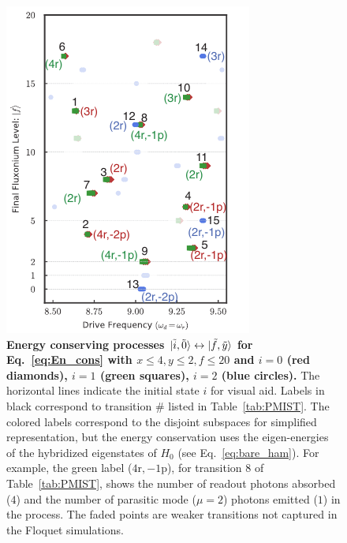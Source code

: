 \documentclass[%
reprint,
superscriptaddress,
 amsmath,amssymb,
 aps,
 prx,
longbibliography,
floatfix,
]{revtex4-2}
\begin{document}
\begin{figure}[t]
    \centering
    \includegraphics[width=\linewidth]{Figures/Trans_.pdf}
    \caption{{\bf Energy conserving processes $\ket{\tilde{i},\tilde{0}}\leftrightarrow\ket{\tilde{f},\tilde{y}}$ for Eq.~\ref{eq:En_cons} with $x\le 4, y\le 2, f\le 20$ and $i=0$ (red diamonds), $i=1$ (green squares), $i=2$ (blue circles).} The horizontal lines indicate the initial state $i$ for visual aid. Labels in black correspond to transition $\#$ listed in Table~\ref{tab:PMIST}. The colored labels correspond to the disjoint subspaces for simplified representation, but the energy conservation uses the eigen-energies of the hybridized eigenstates of $H_{0}$ (see Eq.~\ref{eq:bare_ham}). For example, the green label ($4 \mathrm{r},-1 \mathrm{p}$), for transition $8$ of Table~\ref{tab:PMIST}, shows the number of readout photons absorbed ($4$) and the number of parasitic mode ($\mu=2$) photons emitted ($1$) in the process. The faded points are weaker transitions not captured in the Floquet simulations.
}
    \label{fig:trans_prof}
\end{figure}
\end{document}
